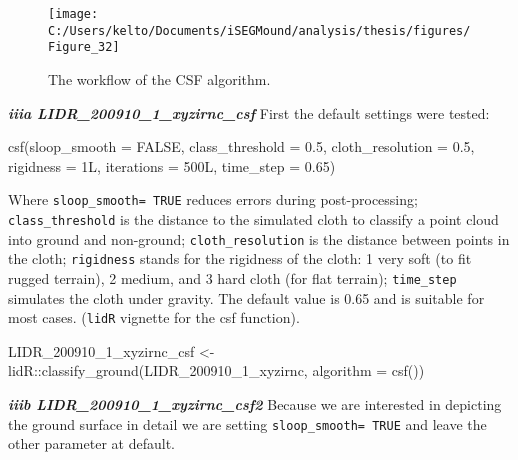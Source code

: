 \documentclass[
  12pt,
]{article}
\newenvironment{Shaded}{\begin{snugshade}}{\end{snugshade}}
\newcommand{\AttributeTok}[1]{\textcolor[rgb]{0.77,0.63,0.00}{#1}}
\newcommand{\ConstantTok}[1]{\textcolor[rgb]{0.00,0.00,0.00}{#1}}
\newcommand{\FloatTok}[1]{\textcolor[rgb]{0.00,0.00,0.81}{#1}}
\newcommand{\FunctionTok}[1]{\textcolor[rgb]{0.00,0.00,0.00}{#1}}
\newcommand{\NormalTok}[1]{#1}
\newcommand{\OtherTok}[1]{\textcolor[rgb]{0.56,0.35,0.01}{#1}}
\newcommand{\SpecialCharTok}[1]{\textcolor[rgb]{0.00,0.00,0.00}{#1}}
\begin{document}
\begin{figure}

{\centering \texttt{[image: C:/Users/kelto/Documents/iSEGMound/analysis/thesis/figures/Figure\_32]} 

}

\caption{The workflow of the CSF algorithm.}\label{fig:Figure32}
\end{figure}

\textbf{\emph{iiia LIDR\_200910\_1\_xyzirnc\_csf}}
\newline
First the default settings were tested:

\begin{Shaded}
\begin{Highlighting}[]
\FunctionTok{csf}\NormalTok{(}\AttributeTok{sloop\_smooth =} \ConstantTok{FALSE}\NormalTok{, }\AttributeTok{class\_threshold =} \FloatTok{0.5}\NormalTok{, }\AttributeTok{cloth\_resolution =} \FloatTok{0.5}\NormalTok{, }\AttributeTok{rigidness =}\NormalTok{ 1L,}
    \AttributeTok{iterations =}\NormalTok{ 500L, }\AttributeTok{time\_step =} \FloatTok{0.65}\NormalTok{)}
\end{Highlighting}
\end{Shaded}

Where \texttt{sloop\_smooth=\ TRUE} reduces errors during post-processing; \texttt{class\_threshold} is the distance to the simulated cloth to classify a point cloud into ground and non-ground; \texttt{cloth\_resolution} is the distance between points in the cloth; \texttt{rigidness} stands for the rigidness of the cloth: 1 very soft (to fit rugged terrain), 2 medium, and 3 hard cloth (for flat terrain); \texttt{time\_step} simulates the cloth under gravity. The default value is 0.65 and is suitable for most cases. (\texttt{lidR} vignette for the csf function).

\begin{Shaded}
\begin{Highlighting}[]
\NormalTok{LIDR\_200910\_1\_xyzirnc\_csf }\OtherTok{\textless{}{-}}\NormalTok{ lidR}\SpecialCharTok{::}\FunctionTok{classify\_ground}\NormalTok{(LIDR\_200910\_1\_xyzirnc, }\AttributeTok{algorithm =} \FunctionTok{csf}\NormalTok{())}
\end{Highlighting}
\end{Shaded}

\textbf{\emph{iiib LIDR\_200910\_1\_xyzirnc\_csf2}}
\newline
Because we are interested in depicting the ground surface in detail we are setting \texttt{sloop\_smooth=\ TRUE} and leave the other parameter at default.
\end{document}
